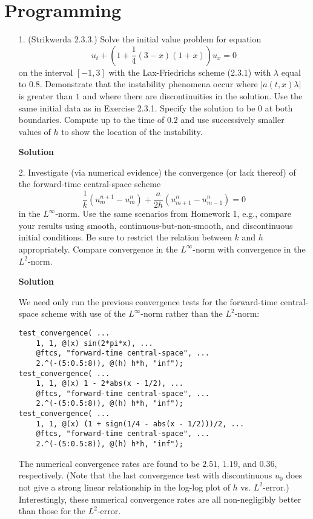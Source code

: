 \documentclass{article}
\providecommand{\abs}[1]{\left\lvert#1\right\rvert}
\begin{document}
\section{Programming}

\begin{itemize}

\item[1.] (Strikwerda 2.3.3.) Solve the initial value problem for equation
\begin{equation*}
u_t + \left( 1 + \frac{1}{4} \left( 3 - x \right) \left( 1 + x \right) \right) u_x = 0
\end{equation*}
on the interval $[-1,3]$ with the Lax-Friedrichs scheme (2.3.1) with $\lambda$ equal to $0.8$. Demonstrate that the instability phenomena occur where $\abs{a(t,x) \lambda}$ is greater than $1$ and where there are discontinuities in the solution. Use the same initial data as in Exercise 2.3.1. Specify the solution to be $0$ at both boundaries. Compute up to the time of $0.2$ and use successively smaller values of $h$ to show the location of the instability.

\textbf{Solution}

\item[2.] Investigate (via numerical evidence) the convergence (or lack thereof) of the forward-time central-space scheme
\begin{equation*}
\frac{1}{k} \left( u^{n+1}_m - u^n_m \right) + \frac{a}{2h} \left( u^n_{m+1} - u^n_{m-1} \right) = 0
\end{equation*}
in the $L^{\infty}$-norm. Use the same scenarios from Homework 1, e.g., compare your results using smooth, continuous-but-non-smooth, and discontinuous initial conditions. Be sure to restrict the relation between $k$ and $h$ appropriately. Compare convergence in the $L^{\infty}$-norm with convergence in the $L^2$-norm.

\textbf{Solution}

We need only run the previous convergence tests for the forward-time central-space scheme with use of the $L^{\infty}$-norm rather than the $L^2$-norm:

\begin{verbatim}
test_convergence( ...
    1, 1, @(x) sin(2*pi*x), ...
    @ftcs, "forward-time central-space", ...
    2.^(-(5:0.5:8)), @(h) h*h, "inf");
test_convergence( ...
    1, 1, @(x) 1 - 2*abs(x - 1/2), ...
    @ftcs, "forward-time central-space", ...
    2.^(-(5:0.5:8)), @(h) h*h, "inf");
test_convergence( ...
    1, 1, @(x) (1 + sign(1/4 - abs(x - 1/2)))/2, ...
    @ftcs, "forward-time central-space", ...
    2.^(-(5:0.5:8)), @(h) h*h, "inf");
\end{verbatim}

The numerical convergence rates are found to be $2.51$, $1.19$, and $0.36$, respectively. (Note that the last convergence test with discontinuous $u_0$ does not give a strong linear relationship in the log-log plot of $h$ vs. $L^2$-error.) Interestingly, these numerical convergence rates are all non-negligibly better than those for the $L^2$-error.

\end{itemize}
\end{document}
